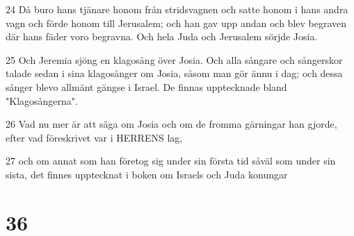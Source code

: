 \par 24 Då buro hans tjänare honom från stridsvagnen och satte honom i hans andra vagn och förde honom till Jerusalem; och han gav upp andan och blev begraven där hans fäder voro begravna. Och hela Juda och Jerusalem sörjde Josia.
\par 25 Och Jeremia sjöng en klagosång över Josia. Och alla sångare och sångerskor talade sedan i sina klagosånger om Josia, såsom man gör ännu i dag; och dessa sånger blevo allmänt gängse i Israel. De finnas upptecknade bland "Klagosångerna".
\par 26 Vad nu mer är att säga om Josia och om de fromma gärningar han gjorde, efter vad föreskrivet var i HERRENS lag,
\par 27 och om annat som han företog sig under sin första tid såväl som under sin sista, det finnes upptecknat i boken om Israels och Juda konungar

\chapter{36}

